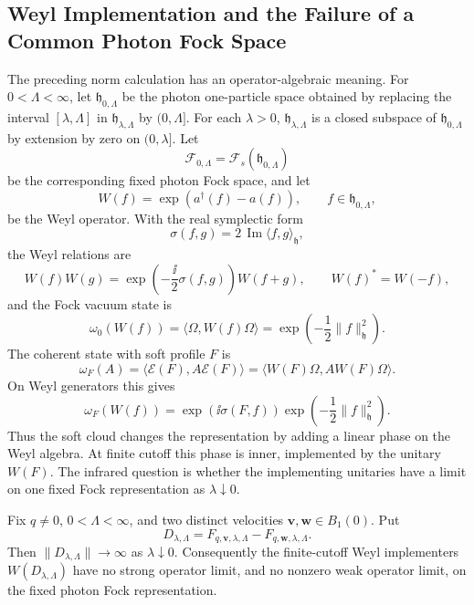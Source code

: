 \subsection{Weyl Implementation and the Failure of a Common Photon Fock Space}

The preceding norm calculation has an operator-algebraic meaning.  For
\(0<\Lambda<\infty\), let \(\mathfrak h_{0,\Lambda}\) be the photon
one-particle space obtained by replacing the interval
\([\lambda,\Lambda]\) in \(\mathfrak h_{\lambda,\Lambda}\) by
\((0,\Lambda]\).  For each \(\lambda>0\),
\(\mathfrak h_{\lambda,\Lambda}\) is a closed subspace of
\(\mathfrak h_{0,\Lambda}\) by extension by zero on \((0,\lambda]\).  Let
\[
  \mathcal F_{0,\Lambda}=\mathcal F_s(\mathfrak h_{0,\Lambda})
\]
be the corresponding fixed photon Fock space, and let
\[
  W(f)=\exp\!\left(a^\dagger(f)-a(f)\right),
  \qquad f\in\mathfrak h_{0,\Lambda},
\]
be the Weyl operator.  With the real symplectic form
\[
  \sigma(f,g)=2\,\operatorname{Im}\langle f,g\rangle_{\mathfrak h},
\]
the Weyl relations are
\begin{equation}
  W(f)W(g)=
  \exp\!\left(-\frac{\ii}{2}\sigma(f,g)\right)W(f+g),
  \qquad
  W(f)^*=W(-f),
  \label{eq:charged-sector-weyl-relations}
\end{equation}
and the Fock vacuum state is
\[
  \omega_0(W(f))=\langle\Omega,W(f)\Omega\rangle
  =
  \exp\!\left(-\frac12\|f\|_{\mathfrak h}^2\right).
\]
The coherent state with soft profile \(F\) is
\[
  \omega_F(A)=
  \langle \mathcal E(F),A\mathcal E(F)\rangle
  =
  \langle W(F)\Omega,A W(F)\Omega\rangle .
\]
On Weyl generators this gives
\begin{equation}
  \omega_F(W(f))
  =
  \exp\!\left(\ii\sigma(F,f)\right)
  \exp\!\left(-\frac12\|f\|_{\mathfrak h}^2\right).
  \label{eq:coherent-weyl-state-characteristic-functional}
\end{equation}
Thus the soft cloud changes the representation by adding a linear phase on
the Weyl algebra.  At finite cutoff this phase is inner, implemented by the
unitary \(W(F)\).  The infrared question is whether the implementing unitaries
have a limit on one fixed Fock representation as \(\lambda\downarrow0\).

\begin{proposition}
\label{prop:no-common-fock-implementer-distinct-velocities}
Fix \(q\ne0\), \(0<\Lambda<\infty\), and two distinct velocities
\(\mathbf v,\mathbf w\in B_1(0)\).  Put
\[
  D_{\lambda,\Lambda}
  =
  F_{q,\mathbf v,\lambda,\Lambda}
  -
  F_{q,\mathbf w,\lambda,\Lambda}.
\]
Then \(\|D_{\lambda,\Lambda}\|\to\infty\) as
\(\lambda\downarrow0\).  Consequently the finite-cutoff Weyl implementers
\(W(D_{\lambda,\Lambda})\) have no strong operator limit, and no nonzero weak
operator limit, on the fixed photon Fock representation.
\end{proposition}

